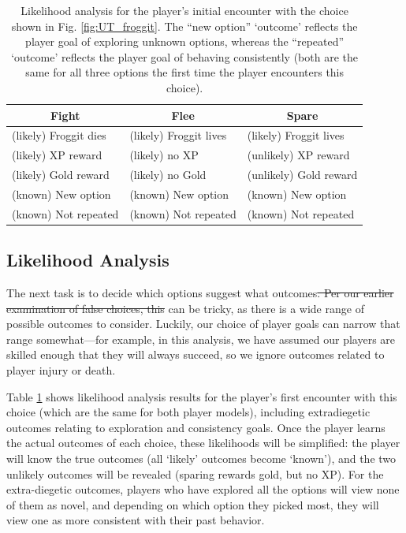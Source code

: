 \documentclass[arts,article,submit,moreauthors,pdftex,10pt,a4paper]{Definitions/mdpi}
\providecommand{\DIFadd}[1]{{\protect\color{blue}\uwave{#1}}} %
\providecommand{\DIFdel}[1]{{\protect\color{red}\sout{#1}}}                      %
\providecommand{\DIFaddbegin}{} %
\providecommand{\DIFaddend}{} %
\providecommand{\DIFdelbegin}{} %
\providecommand{\DIFdelend}{} %
\begin{document}
\begin{table}[H]
\centering
\begin{tabular}{l l l}
  \toprule
 \multicolumn{1}{c}{\textbf{Fight}} & \multicolumn{1}{c}{\textbf{Flee}} & \multicolumn{1}{c}{\textbf{Spare}} \\
  \midrule
 (likely) Froggit dies & (likely) Froggit lives & (likely) Froggit lives \\
 (likely) XP reward & (likely) no XP & (unlikely) XP reward \\
 (likely) Gold reward & (likely) no Gold & (unlikely) Gold reward \\
 (known) New option & (known) New option & (known) New option \\
 (known) Not repeated & (known) Not repeated & (known) Not repeated \\
  \bottomrule
\end{tabular}
  \caption[\emph{Undertale} likelihood analysis]{Likelihood analysis for the player's initial encounter with the choice shown in Fig. \ref{fig:UT_froggit}. The ``new option'' `outcome' reflects the player goal of exploring unknown options, whereas the ``repeated'' `outcome' reflects the player goal of behaving consistently (both are the same for all three options the first time the player encounters this choice).}
\label{tab:UT_likelihoods}
\end{table}

\subsection{Likelihood Analysis}

The next task is to decide which options suggest what outcomes\DIFdelbegin \DIFdel{.
Per our earlier examination of false choices, this }\DIFdelend \DIFaddbegin \DIFadd{, which }\DIFaddend can be tricky, as there is a wide range of possible outcomes to consider.
%
Luckily, our choice of player goals can narrow that range somewhat---for example, in this analysis, we have assumed our players are skilled enough that they will always succeed, so we ignore outcomes related to player injury or death.


Table \ref{tab:UT_likelihoods} shows likelihood analysis results for the player's first encounter with this choice (which are the same for both player models), including extradiegetic outcomes relating to exploration and consistency goals.
%
Once the player learns the actual outcomes of each choice, these likelihoods will be simplified: the player will know the true outcomes (all `likely' outcomes become `known'), and the two unlikely outcomes will be revealed (sparing rewards gold, but no XP).
%
For the extra-diegetic outcomes, players who have explored all the options will view none of them as novel, and depending on which option they picked most, they will view one as more consistent with their past behavior.
\end{document}

